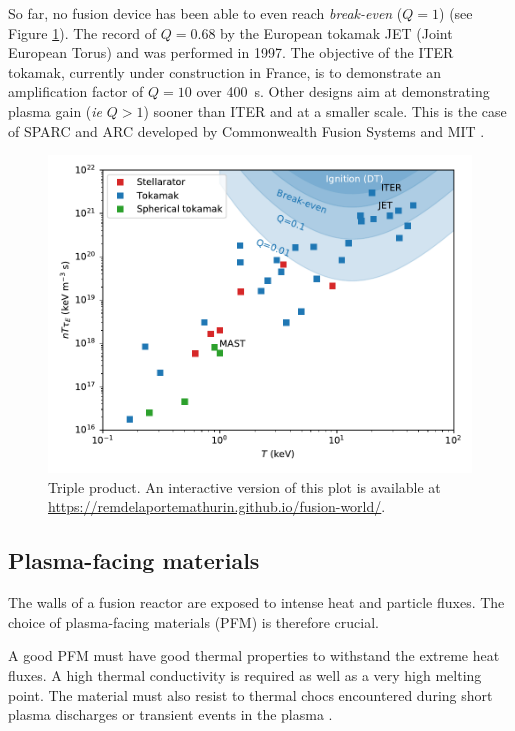 So far, no fusion device has been able to even reach \textit{break-even} ($Q = 1$) (see Figure \ref{fig: triple product vs T}).
The record of $Q = 0.68$ by the European tokamak JET (Joint European Torus) and was performed in 1997.
The objective of the ITER tokamak, currently under construction in France, is to demonstrate an amplification factor of $Q=10$ over \SI{400}{s}. 
Other designs aim at demonstrating plasma gain (\textit{ie} $Q > 1$) sooner than ITER and at a smaller scale.
This is the case of SPARC and ARC developed by Commonwealth Fusion Systems and MIT .

\begin{figure}
    \centering
    \includegraphics[width=\linewidth]{Figures/Chapter1/triple_product_vs_T.pdf}
    \caption{Triple product. An interactive version of this plot is available at \href{https://remdelaportemathurin.github.io/fusion-world/}{https://remdelaportemathurin.github.io/fusion-world/}.}
    \label{fig: triple product vs T}
\end{figure}

\subsection{Plasma-facing materials}

The walls of a fusion reactor are exposed to intense heat and particle fluxes.
The choice of plasma-facing materials (PFM) is therefore crucial.

A good PFM must have good thermal properties to withstand the extreme heat fluxes.
A high thermal conductivity is required as well as a very high melting point.
The material must also resist to thermal chocs encountered during short plasma discharges or transient events in the plasma .

